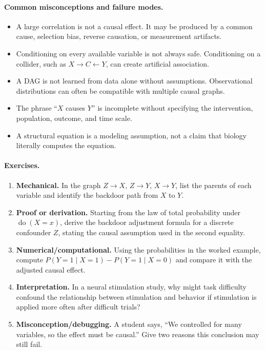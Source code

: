 \paragraph{Common misconceptions and failure modes.}
\begin{itemize}[leftmargin=*]
\item A large correlation is not a causal effect. It may be produced by a common cause, selection bias, reverse causation, or measurement artifacts.
\item Conditioning on every available variable is not always safe. Conditioning on a collider, such as \(X\to C\leftarrow Y\), can create artificial association.
\item A DAG is not learned from data alone without assumptions. Observational distributions can often be compatible with multiple causal graphs.
\item The phrase ``\(X\) causes \(Y\)'' is incomplete without specifying the intervention, population, outcome, and time scale.
\item A structural equation is a modeling assumption, not a claim that biology literally computes the equation.
\end{itemize}

\paragraph{Exercises.}
\begin{enumerate}[label=\textbf{19.1.\arabic*.}, leftmargin=*]
\item \textbf{Mechanical.} In the graph \(Z\to X\), \(Z\to Y\), \(X\to Y\), list the parents of each variable and identify the backdoor path from \(X\) to \(Y\).
\item \textbf{Proof or derivation.} Starting from the law of total probability under \(\operatorname{do}(X=x)\), derive the backdoor adjustment formula for a discrete confounder \(Z\), stating the causal assumption used in the second equality.
\item \textbf{Numerical/computational.} Using the probabilities in the worked example, compute \(P(Y=1\mid X=1)-P(Y=1\mid X=0)\) and compare it with the adjusted causal effect.
\item \textbf{Interpretation.} In a neural stimulation study, why might task difficulty confound the relationship between stimulation and behavior if stimulation is applied more often after difficult trials?
\item \textbf{Misconception/debugging.} A student says, ``We controlled for many variables, so the effect must be causal.'' Give two reasons this conclusion may still fail.
\end{enumerate}

